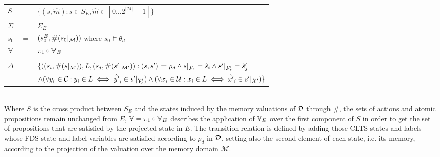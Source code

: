 \vspace{1em}
\begin{tabular}{ l c l }
	$S$ &$=$& $\{(s,\hat{m}) : s \in S_E, \hat{m} \in [0\ldots2^{|\mathcal{M}|}-1] \}$\\
	$\Sigma$ &$=$&$\Sigma_E$\\	
	$s_0$&$=$&$(s_0^{E}, \#(s_0|_{\mathcal{M}}))$ where $s_0 \models \theta_d$ \\
	$\mathbb{V}$&$=$&$\pi_1 \circ \mathbb{V}_E$\\
	&&\\
	$\Delta$&$=$&$\{((s_i,\#(s|_{\mathcal{M}})),L,(s_j,\#(s'|_{\mathcal{M}'})): (s, s') \models \rho_d \wedge  s|_{{\mathcal{Y}}_s} = \hat{s}_{i}  \wedge s'|_{{\mathcal{Y}}'_s} = \hat{s}_{j}'$ \\
	&&$\wedge (\forall y_i \in \mathcal{C} : y_i \in L \iff \hat{y'}_i \in s'|_{{\mathcal{Y}}'_c})  \wedge (\forall x_i \in \mathcal{U} : x_i \in L \iff \hat{x'}_i \in s'|_{{\mathcal{X}}'})  \}$\\
\end{tabular}
\vspace{1em}
\\
Where $S$ is the cross product between $S_E$ and the states induced by the memory valuations of $\mathcal{D}$ through $\#$, the sets of actions and atomic propositions remain unchanged from $E$, $\mathbb{V}=\pi_1 \circ \mathbb{V}_E$ describes the application of $\mathbb{V}_E$ over the first component of $S$ in order to get the set of propositions that are satisfied by the projected state in $E$. The transition relation is defined by adding those CLTS states and labels whose FDS state and label variables are satisfied according to $\rho_d$ in $\mathcal{D}$, setting also the second element of each state, i.e. its memory, according to the projection of the valuation over the memory domain $\mathcal{M}$.


